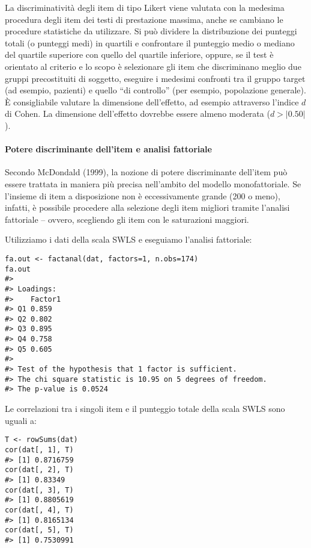 La discriminatività degli item di tipo Likert viene valutata con la medesima procedura degli item dei testi di prestazione massima, anche se cambiano le procedure statistiche da utilizzare. Si può dividere la distribuzione dei punteggi totali (o punteggi medi) in quartili e confrontare il punteggio medio o mediano del quartile superiore con quello del quartile inferiore, oppure, se il test è orientato al criterio e lo scopo è selezionare gli item che discriminano meglio due gruppi precostituiti di soggetto, eseguire i medesimi confronti tra il gruppo target (ad esempio, pazienti) e quello ``di controllo'' (per esempio, popolazione generale). È consigliabile valutare la dimensione dell'effetto, ad esempio attraverso l'indice $d$ di Cohen. La dimensione dell'effetto dovrebbe essere almeno moderata ($d > |0.50|$).


\paragraph{Potere discriminante dell'item e analisi fattoriale}

Secondo McDondald (1999), la nozione di potere discriminante dell'item può essere trattata in maniera più precisa nell'ambito del modello monofattoriale. Se l'insieme di item a disposizione non è eccessivamente grande (200  o meno), infatti,  è possibile procedere alla selezione  degli item migliori tramite l'analisi fattoriale -- ovvero, scegliendo gli item con le saturazioni maggiori.   



\begin{exmp}

Utilizziamo i dati della scala SWLS e eseguiamo l'analisi fattoriale:
\begin{lstlisting}
fa.out <- factanal(dat, factors=1, n.obs=174)
fa.out
#> 
#> Loadings:
#>    Factor1
#> Q1 0.859  
#> Q2 0.802  
#> Q3 0.895  
#> Q4 0.758  
#> Q5 0.605  
#> 
#> Test of the hypothesis that 1 factor is sufficient.
#> The chi square statistic is 10.95 on 5 degrees of freedom.
#> The p-value is 0.0524 
\end{lstlisting}
Le correlazioni tra i singoli item e il punteggio totale della scala SWLS sono uguali a:
\begin{lstlisting}
T <- rowSums(dat)
cor(dat[, 1], T)
#> [1] 0.8716759
cor(dat[, 2], T)
#> [1] 0.83349
cor(dat[, 3], T)
#> [1] 0.8805619
cor(dat[, 4], T)
#> [1] 0.8165134
cor(dat[, 5], T)
#> [1] 0.7530991 
\end{lstlisting}
\end{exmp}

